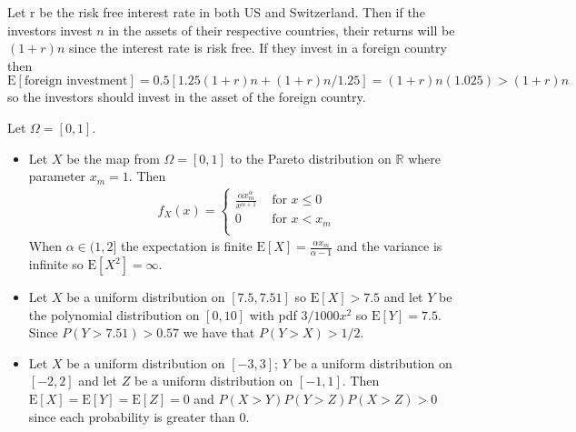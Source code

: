 \documentclass[12pt]{article}
\newcommand{\R}{\mathbb{R}}
\newcommand{\E}{\mathrm{E}}
\newenvironment{problem}[2][Problem]{\begin{trivlist}
\item[\hskip \labelsep {\bfseries #1}\hskip \labelsep {\bfseries #2}]}{\end{trivlist}}
\begin{document}
\begin{problem}{5.} Let r be the risk free interest rate in both US and Switzerland. Then if the investors invest $n$ in the assets of their respective countries, their returns will be $(1+r)n$ since the interest rate is risk free. If they invest in a foreign country then
$$\E[\text{foreign investment}] = 0.5[1.25(1+r)n + (1+r)n/1.25] = (1+r)n(1.025) > (1+r)n$$
so the investors should invest in the asset of the foreign country. 
\end{problem}

\begin{problem}{6.} Let $\Omega = [0,1]$. 
\begin{itemize}
\item[(a)] Let $X$ be the map from $\Omega = [0,1]$ to the Pareto distribution on $\R$ where parameter $x_m = 1$. Then 
\begin{equation*}
\begin{aligned}
f_X(x) = \begin{cases}
               \frac{\alpha x_m^\alpha}{x^{\alpha +1}}  &\text{ for } x \leq 0 \\
               0  &\text{ for } x<x_m \\
            \end{cases}
\end{aligned}
\end{equation*}
When $\alpha \in (1,2]$ the expectation is finite $\E[X] = \frac{\alpha x_m}{\alpha -1}$ and the variance is infinite so $\E[X^2] = \infty$.
\item[(b)] Let $X$ be a uniform distribution on $[7.5, 7.51]$ so $\E[X] >7.5$ and let $Y$ be the polynomial distribution on $[0,10]$ with pdf $3/1000 x^2$ so $\E[Y] = 7.5$. Since $P(Y>7.51) >0.57$ we have that $P(Y > X) > 1/2$. 
\item[(c)] Let $X$ be a uniform distribution on $[-3,3]$; $Y$ be a uniform distribution on $[-2,2]$ and let $Z$ be a uniform distribution on $[-1,1]$. Then $\E[X] = \E[Y] = \E[Z] = 0$ and $P(X>Y) P(Y>Z) P(X>Z) > 0$ since each probability is greater than 0.
\end{itemize}
\end{problem}
\end{document}
